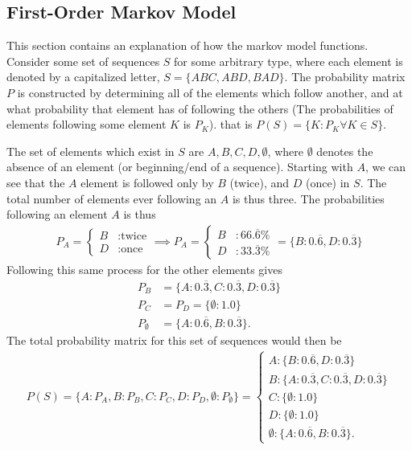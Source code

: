\subsection{First-Order Markov Model}

This section contains an explanation of how the markov model functions. Consider some set of sequences $S$ for some arbitrary type, where each element is denoted by a capitalized letter, $S=\{ABC, ABD, BAD\}$. The probability matrix $P$ is constructed by determining all of the elements which follow another, and at what probability that element has of following the others (The probabilities of elements following some element $K$ is $P_K$). that is $P(S) = \{K:P_K \forall K \in S\}$.

The set of elements which exist in $S$ are ${A, B, C, D, \emptyset}$, where $\emptyset$ denotes the absence of an element (or beginning/end of a sequence). Starting with $A$, we can see that the $A$ element is followed only by $B$ (twice), and $D$ (once) in $S$. The total number of elements ever following an $A$ is thus three. The probabilities following an element $A$ is thus
\begin{align}
P_A = \begin{cases}
  B & :\text{twice} \\
  D & :\text{once}
\end{cases} \implies P_A = \begin{cases}
  B & : 66.\overline{6}\% \\
  D & : 33.\overline{3}\%
\end{cases} = \{B:0.\overline{6}, D:0.\overline{3}\}
\end{align}
Following this same process for the other elements gives
\begin{align}
P_B &= \{A:0.\overline{3}, C:0.\overline{3}, D:0.\overline{3}\} \\ P_C &= P_D = \{\emptyset:1.0\}\\ P_\emptyset &= \{A:0.\overline{6}, B:0.\overline{3}\}.
\end{align}
The total probability matrix for this set of sequences would then be
\begin{align}
P(S) = \{A:P_A, B:P_B, C:P_C, D:P_D, \emptyset: P_\emptyset\} = \begin{cases}
A:\{B:0.\overline{6}, D:0.\overline{3}\} \\
B: \{A:0.\overline{3}, C:0.\overline{3}, D:0.\overline{3}\} \\
C: \{\emptyset:1.0\} \\
D: \{\emptyset:1.0\} \\
\emptyset: \{A:0.\overline{6}, B:0.\overline{3}\}.
\end{cases}
\end{align}
